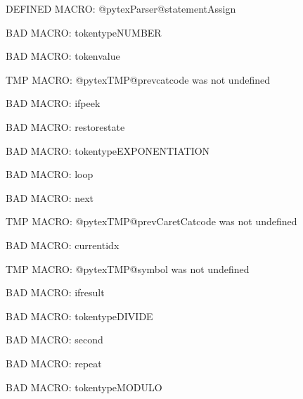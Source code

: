 \ifx\@pytexParser@statementAssign\undefined\else DEFINED MACRO: @pytexParser@statementAssign
\fi

BAD MACRO: tokentypeNUMBER

BAD MACRO: tokenvalue

\ifx\@pytexTMP@prevcatcode\undefined\else TMP MACRO: @pytexTMP@prevcatcode was not undefined
\fi

BAD MACRO: ifpeek

BAD MACRO: restorestate

BAD MACRO: tokentypeEXPONENTIATION

BAD MACRO: loop

BAD MACRO: next

\ifx\@pytexTMP@prevCaretCatcode\undefined\else TMP MACRO: @pytexTMP@prevCaretCatcode was not undefined
\fi

BAD MACRO: currentidx

\ifx\@pytexTMP@symbol\undefined\else TMP MACRO: @pytexTMP@symbol was not undefined
\fi

BAD MACRO: ifresult

BAD MACRO: tokentypeDIVIDE

BAD MACRO: second

BAD MACRO: repeat

BAD MACRO: tokentypeMODULO

